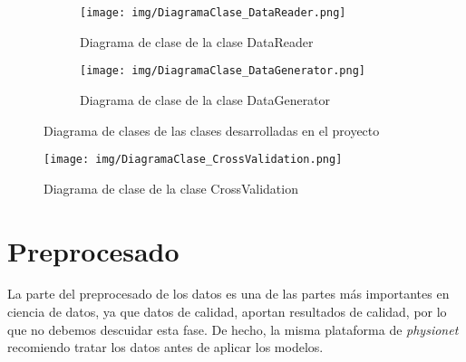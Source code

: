     

        \begin{figure}[H]
             \centering
             \begin{subfigure}[b]{0.3\textwidth}
             \texttt{[image: img/DiagramaClase\_DataReader.png]}
             \caption{Diagrama de clase de la clase DataReader}
             \label{fig:DC_DataReader}
             \end{subfigure}
             \hfill
             \begin{subfigure}[b]{0.3\textwidth}
             \texttt{[image: img/DiagramaClase\_DataGenerator.png]}
             \caption{Diagrama de clase de la clase DataGenerator}
             \label{fig:DC_DataGenerator}
             \end{subfigure}
             \caption{Diagrama de clases de las clases desarrolladas en el proyecto}
             \label{fig:DC1}
         \end{figure}
         \newpage
         \begin{figure}[H]
             \centering
             \texttt{[image: img/DiagramaClase\_CrossValidation.png]}
             \caption{Diagrama de clase de la clase CrossValidation}
             \label{fig:DC2}
         \end{figure}
         


\section{Preprocesado}

    La parte del preprocesado de los datos es una de las partes más importantes en ciencia de datos, ya que datos de calidad, aportan resultados de calidad, por lo que no debemos descuidar esta fase. De hecho, la misma plataforma de \textit{physionet} recomiendo tratar los datos antes de aplicar los modelos.\\
    
